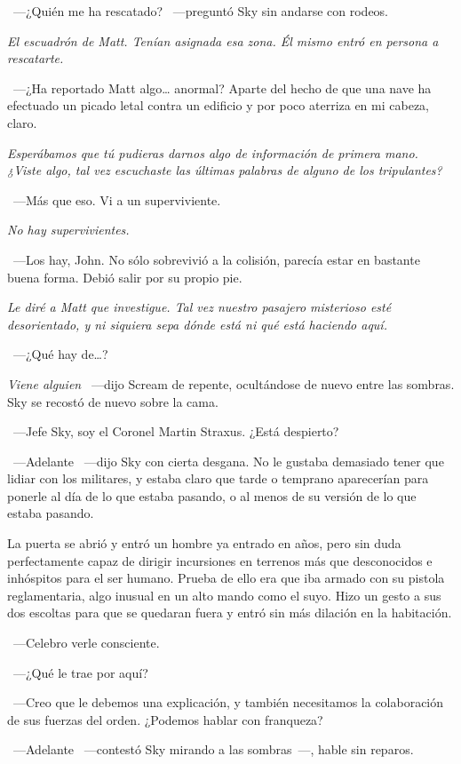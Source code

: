 ~---¿Quién me ha rescatado? ~---preguntó Sky sin andarse con rodeos.

\emph{El escuadrón de Matt. Tenían asignada esa zona. Él mismo entró en persona a rescatarte.}

~---¿Ha reportado Matt algo\dots{} anormal? Aparte del hecho de que una nave ha efectuado un picado letal contra un edificio y por poco aterriza en mi cabeza, claro.

\emph{Esperábamos que tú pudieras darnos algo de información de primera mano. ¿Viste algo, tal vez escuchaste las últimas palabras de alguno de los tripulantes?}

~---Más que eso. Vi a un superviviente.

\emph{No hay supervivientes.}

~---Los hay, John. No sólo sobrevivió a la colisión, parecía estar en bastante buena forma. Debió salir por su propio pie.

\emph{Le diré a Matt que investigue. Tal vez nuestro pasajero misterioso esté desorientado, y ni siquiera sepa dónde está ni qué está haciendo aquí.}

~---¿Qué hay de\dots{}?

\emph{Viene alguien} ~---dijo Scream de repente, ocultándose de nuevo entre las sombras. Sky se recostó de nuevo sobre la cama.

~---Jefe Sky, soy el Coronel Martin Straxus. ¿Está despierto?

~---Adelante ~---dijo Sky con cierta desgana. No le gustaba demasiado tener que lidiar con los militares, y estaba claro que tarde o temprano aparecerían para ponerle al día de lo que estaba pasando, o al menos de su versión de lo que estaba pasando.

La puerta se abrió y entró un hombre ya entrado en años, pero sin duda perfectamente capaz de dirigir incursiones en terrenos más que desconocidos e inhóspitos para el ser humano. Prueba de ello era que iba armado con su pistola reglamentaria, algo inusual en un alto mando como el suyo. Hizo un gesto a sus dos escoltas para que se quedaran fuera y entró sin más dilación en la habitación.

~---Celebro verle consciente.

~---¿Qué le trae por aquí?

~---Creo que le debemos una explicación, y también necesitamos la colaboración de sus fuerzas del orden. ¿Podemos hablar con franqueza?

~---Adelante ~---contestó Sky mirando a las sombras~---, hable sin reparos.

